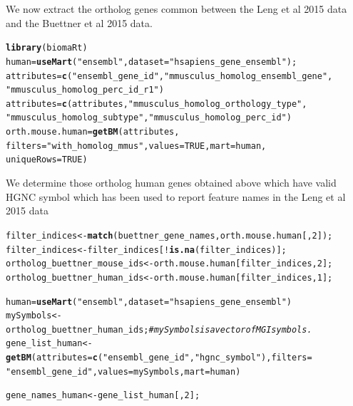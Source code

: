 \documentclass[12pt]{article}\usepackage[]{graphicx}\usepackage[usenames,dvipsnames]{color}
\makeatletter
\newcommand{\hlnum}[1]{\textcolor[rgb]{0.686,0.059,0.569}{#1}}%
\newcommand{\hlstr}[1]{\textcolor[rgb]{0.192,0.494,0.8}{#1}}%
\newcommand{\hlcom}[1]{\textcolor[rgb]{0.678,0.584,0.686}{\textit{#1}}}%
\newcommand{\hlopt}[1]{\textcolor[rgb]{0,0,0}{#1}}%
\newcommand{\hlstd}[1]{\textcolor[rgb]{0.345,0.345,0.345}{#1}}%
\newcommand{\hlkwb}[1]{\textcolor[rgb]{0.69,0.353,0.396}{#1}}%
\newcommand{\hlkwc}[1]{\textcolor[rgb]{0.333,0.667,0.333}{#1}}%
\newcommand{\hlkwd}[1]{\textcolor[rgb]{0.737,0.353,0.396}{\textbf{#1}}}%
\newenvironment{kframe}{%
 \def\at@end@of@kframe{}%
 \ifinner\ifhmode%
  \def\at@end@of@kframe{\end{minipage}}%
  \begin{minipage}{\columnwidth}%
 \fi\fi%
 \def\FrameCommand##1{\hskip\@totalleftmargin \hskip-\fboxsep
 \colorbox{shadecolor}{##1}\hskip-\fboxsep
     \hskip-\linewidth \hskip-\@totalleftmargin \hskip\columnwidth}%
 \MakeFramed {\advance\hsize-\width
   \@totalleftmargin\z@ \linewidth\hsize
   \@setminipage}}%
 {\par\unskip\endMakeFramed%
 \at@end@of@kframe}
\newenvironment{knitrout}{}{} %
\makeatother
\begin{document}
We now extract the ortholog genes common between the Leng et al 2015 data and the Buettner et al 2015 data.

\begin{knitrout}
\color{fgcolor}\begin{kframe}
\begin{alltt}
\hlkwd{library}\hlstd{(biomaRt)}
\hlstd{human} \hlkwb{=} \hlkwd{useMart}\hlstd{(}\hlstr{"ensembl"}\hlstd{,} \hlkwc{dataset} \hlstd{=} \hlstr{"hsapiens_gene_ensembl"}\hlstd{);}
\hlstd{attributes} \hlkwb{=} \hlkwd{c}\hlstd{(}\hlstr{"ensembl_gene_id"}\hlstd{,}\hlstr{"mmusculus_homolog_ensembl_gene"}\hlstd{,}
               \hlstr{"mmusculus_homolog_perc_id_r1"}\hlstd{)}
\hlstd{attributes}\hlkwb{=}\hlkwd{c}\hlstd{(attributes,}\hlstr{"mmusculus_homolog_orthology_type"}\hlstd{,}
\hlstr{"mmusculus_homolog_subtype"}\hlstd{,} \hlstr{"mmusculus_homolog_perc_id"}\hlstd{)}
\hlstd{orth.mouse.human} \hlkwb{=} \hlkwd{getBM}\hlstd{(attributes,}
\hlkwc{filters}\hlstd{=}\hlstr{"with_homolog_mmus"}\hlstd{,}\hlkwc{values}\hlstd{=}\hlnum{TRUE}\hlstd{,} \hlkwc{mart} \hlstd{= human,}
\hlkwc{uniqueRows}\hlstd{=}\hlnum{TRUE}\hlstd{)}
\end{alltt}
\end{kframe}
\end{knitrout}

We determine those ortholog human genes obtained above which have valid HGNC symbol 
which has been used to report feature names in the Leng et al 2015 data

\begin{knitrout}
\color{fgcolor}\begin{kframe}
\begin{alltt}
\hlstd{filter_indices} \hlkwb{<-} \hlkwd{match}\hlstd{(buettner_gene_names, orth.mouse.human[,}\hlnum{2}\hlstd{]);}
\hlstd{filter_indices} \hlkwb{<-} \hlstd{filter_indices[}\hlopt{!}\hlkwd{is.na}\hlstd{(filter_indices)];}
\hlstd{ortholog_buettner_mouse_ids} \hlkwb{<-} \hlstd{orth.mouse.human[filter_indices,}\hlnum{2}\hlstd{];}
\hlstd{ortholog_buettner_human_ids} \hlkwb{<-} \hlstd{orth.mouse.human[filter_indices,}\hlnum{1}\hlstd{];}

\hlstd{human} \hlkwb{=} \hlkwd{useMart}\hlstd{(}\hlstr{"ensembl"}\hlstd{,} \hlkwc{dataset} \hlstd{=} \hlstr{"hsapiens_gene_ensembl"}\hlstd{)}
\hlstd{mySymbols} \hlkwb{<-} \hlstd{ortholog_buettner_human_ids;} \hlcom{# mySymbols is a vector of MGI symbols.}
\hlstd{gene_list_human} \hlkwb{<-} \hlkwd{getBM}\hlstd{(} \hlkwc{attributes}\hlstd{=}\hlkwd{c}\hlstd{(}\hlstr{"ensembl_gene_id"}\hlstd{,} \hlstr{"hgnc_symbol"}\hlstd{) ,} \hlkwc{filters}\hlstd{=}
\hlstr{"ensembl_gene_id"}\hlstd{,} \hlkwc{values} \hlstd{=mySymbols ,}\hlkwc{mart}\hlstd{=human)}

\hlstd{gene_names_human} \hlkwb{<-} \hlstd{gene_list_human[,}\hlnum{2}\hlstd{];}
\end{alltt}
\end{kframe}
\end{knitrout}
\end{document}
